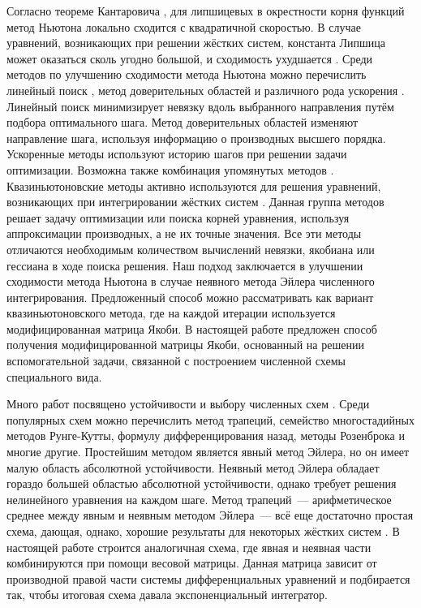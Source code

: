 Согласно теореме Кантаровича \cite{kantorovich1949method,ortega2000iterative}, для липшицевых в окрестности корня функций метод Ньютона локально сходится с квадратичной скоростью.
В случае уравнений, возникающих при решении жёстких систем, константа Липшица может оказаться сколь угодно большой, и сходимость ухудшается \cite{auzinger1990note, auzinger1993modern}.
Среди методов по улучшению сходимости метода Ньютона можно перечислить линейный поиск \cite{armijo1966minimization, wolfe1969convergence},
метод доверительных областей \cite{sorensen1982newton} и различного рода ускорения \cite{anderson1965iterative, nesterov27method, brown1994convergence}.
Линейный поиск минимизирует невязку вдоль выбранного направления путём подбора оптимального шага.
Метод доверительных областей изменяют направление шага, используя информацию о производных высшего порядка.
Ускоренные методы используют историю шагов при решении задачи оптимизации.
Возможна также комбинация упомянутых методов \cite{brune2015composing}.
Квазиньютоновские методы активно используются для решения уравнений, возникающих при интегрировании жёстких систем
\cite{brown1985experiments, alexander1991modified, moore1994stepsize, schlenkrich2006application}.
Данная группа методов решает задачу оптимизации или поиска корней уравнения, используя аппроксимации производных, а не их точные значения.
Все эти методы отличаются необходимым количеством вычислений невязки, якобиана или гессиана в ходе поиска решения.
Наш подход заключается в улучшении сходимости метода Ньютона в случае неявного метода Эйлера численного интегрирования.
Предложенный способ можно рассматривать как вариант квазиньютоновского метода, где на каждой итерации используется модифицированная матрица Якоби.
В настоящей работе предложен способ получения модифицированной матрицы Якоби, основанный на решении вспомогательной задачи,
связанной с построением численной схемы специального вида.

Много работ посвящено устойчивости и выбору численных схем \cite{auzinger1993modern, dahlquist1963special, dahlquist1975stability, liu2019study}.
Среди популярных схем можно перечислить метод трапеций, семейство многостадийных методов Рунге-Кутты, формулу дифференцирования назад, методы Розенброка и многие другие.
Простейшим методом является явный метод Эйлера, но он имеет малую область абсолютной устойчивости.
Неявный метод Эйлера обладает гораздо большей областью абсолютной устойчивости, однако требует решения нелинейного уравнения на каждом шаге.
Метод трапеций~--- арифметическое среднее между явным и неявным методом Эйлера~--- всё еще достаточно простая схема,
дающая, однако, хорошие результаты для некоторых жёстких систем \cite{auzinger1989asymptotic}.
В настоящей работе строится аналогичная схема, где явная и неявная части комбинируются при помощи весовой матрицы.
Данная матрица зависит от производной правой части системы дифференциальных уравнений и подбирается так, чтобы итоговая схема давала экспоненциальный интегратор.
